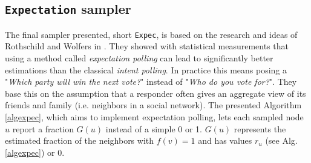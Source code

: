 \subsection{\texttt{Expectation} sampler}
The final sampler presented, short \texttt{Expec}, is based on the research and ideas of Rothschild and Wolfers in \cite{rothschild2009forecasting}. They showed with statistical measurements that using a method called \textit{expectation polling} can lead to significantly better estimations than the classical \textit{intent polling}.
In practice this means posing a "\textit{Which party will win the next vote?}" instead of "\textit{Who do you vote for?}".
They base this on the assumption that a responder often gives an aggregate view of its friends and family (i.e. neighbors in a social network).
The presented Algorithm \ref{algexpec}, which aims to implement expectation polling, lets each sampled node $u$ report a fraction $G(u)$ instead of a simple 0 or 1. $G(u)$ represents the estimated fraction of the neighbors with $f(v) = 1$ and has values $r_u$ (see Alg. \ref{algexpec}) or $0$.

